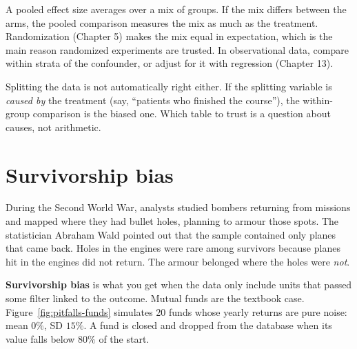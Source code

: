 A pooled effect size averages over a mix of groups. If the mix differs between the
arms, the pooled comparison measures the mix as much as the treatment. Randomization
(Chapter 5) makes the mix equal in expectation, which is the main reason randomized
experiments are trusted. In observational data, compare within strata of the
confounder, or adjust for it with regression (Chapter 13).

\begin{trapbox}
Splitting the data is not automatically right either. If the splitting variable is
\emph{caused by} the treatment (say, ``patients who finished the course''), the
within-group comparison is the biased one. Which table to trust is a question about
causes, not arithmetic.
\end{trapbox}

\section{Survivorship bias}
\label{sec:pitfalls-survivor}

During the Second World War, analysts studied bombers returning from missions and
mapped where they had bullet holes, planning to armour those spots. The statistician
Abraham Wald pointed out that the sample contained only planes that came back. Holes in
the engines were rare among survivors because planes hit in the engines did not
return. The armour belonged where the holes were \emph{not}.

\textbf{Survivorship bias} is what you get when the data only include units that
passed some filter linked to the outcome. Mutual funds are the textbook case.
Figure~\ref{fig:pitfalls-funds} simulates 20 funds whose yearly returns are pure
noise: mean $0\%$, SD $15\%$. A fund is closed and dropped from the database when
its value falls below $80\%$ of the start.

